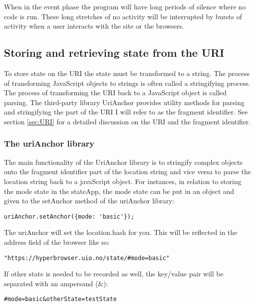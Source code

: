 \documentclass[english]{ifimaster}
\begin{document}
When in the event phase the program will have long periods of silence where no code is run. These long stretches of no activity will be interrupted by bursts of activity when a user interacts with the site or the browsers.


\subsection{Storing and retrieving state from the URI}
To store state on the URI the state must be transformed to a string. The process of transforming JavaScript objects to strings is often called a stringifying process. The process of transforming the URI back to a JavaScript object is called parsing. The third-party library UriAnchor provides utility methods for parsing and stringifying the part of the URI I will refer to as the fragment identifier. See section \ref{sec:URI} for a detailed discussion on the URI and the fragment identifier. 


\subsubsection{The uriAnchor library}
The main functionality of the UriAnchor library is to stringify complex 
objects onto the fragment identifier part of the location string and vice versa to parse the location string back to a javaScript object. For instances, in relation to storing the mode state in the stateApp, the mode state can be put in an object and given to the setAnchor method of the uriAnchor library:
\label{sec:results_uriAnchor}
\begin{lstlisting}[caption=Setting the location with the Uri Anchor library]
  uriAnchor.setAnchor({mode: 'basic'}); 
\end{lstlisting}


The uriAnchor will set the location.hash for you. This will be reflected in the address field of the browser like so: 
\begin{lstlisting}[caption=The browsers address field after using the setAnchor 
method of the uriAnchor library]
  "https://hyperbrowser.uio.no/state/#mode=basic"
\end{lstlisting}

If other state is needed to be recorded as well, the key/value pair will be separated with an ampersand (\&):

\begin{lstlisting}[caption=Standard key/value separation of the URI parameters]
  #mode=basic&otherState=testState
\end{lstlisting}
\end{document}
